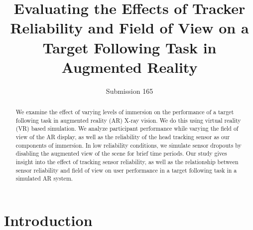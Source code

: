 \documentclass{acmsiggraph}                     %
\title{Evaluating the Effects of Tracker Reliability and Field of View on a Target Following Task in Augmented Reality}
\author{
Submission 165
}
\begin{document}


\maketitle


\begin{abstract}

We examine the effect of varying levels of immersion on the performance of a target following task in augmented reality (AR) X-ray vision.  We do this using virtual reality (VR) based simulation.  We analyze participant performance while varying the field of view of the AR display, as well as the reliability of the head tracking sensor as our components of immersion.  In low reliability conditions, we simulate sensor dropouts by disabling the augmented view of the scene for brief time periods.  Our study gives insight into the effect of tracking sensor reliability, as well as the relationship between sensor reliability and field of view on user performance in a target following task in a simulated AR system.

\end{abstract}


\begin{CRcatlist}
\end{CRcatlist}

\keywordlist

\section{Introduction}

\end{document}
